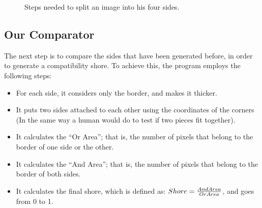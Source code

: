 \documentclass{article}
\begin{document}
\begin{figure}
  \caption{Steps needed to split an image into his four sides.}
  \label{fig:splitting_sides}
  
\end{figure}



\subsection{Our Comparator}\label{document:my_comparator}
The next step is to compare the sides that have been
generated before, in order to generate
a compatibility shore.
To achieve this, the program employs
the following steps:

\begin{itemize}
  \item For each side, it considers only the border, and  makes it thicker.
  \item It puts two sides attached to each other using the coordinates of the corners (In the same way a human would do to test if two pieces fit together).
  \item It calculates the “Or Area”; that is, the number of pixels that belong to the border of one side or the other.
  \item It calculates the “And Area”; that is, the number of pixels that belong to the border of both sides.
  \item It calculates the final shore, which is defined as: \(Shore = \frac{And \space Area}{Or \space Area}\), and goes from 0 to 1.
\end{itemize}
\end{document}
